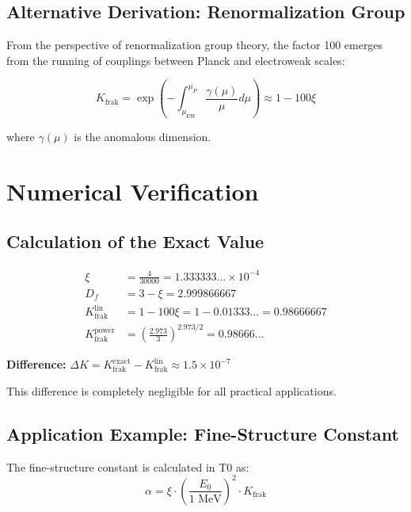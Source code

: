 	\subsection{Alternative Derivation: Renormalization Group}
	
	From the perspective of renormalization group theory, the factor 100 emerges from the running of couplings between Planck and electroweak scales:
	
	\begin{equation}
		K_{\text{frak}} = \exp\left(-\int_{\mu_{\text{EW}}}^{\mu_P} \frac{\gamma(\mu)}{\mu} d\mu\right) \approx 1 - 100\xi
	\end{equation}
	
	where $\gamma(\mu)$ is the anomalous dimension.
	
	\section{Numerical Verification}
	
	\subsection{Calculation of the Exact Value}
	
	\begin{align}
		\xi &= \frac{4}{30000} = 1.333333... \times 10^{-4} \\
		D_f &= 3 - \xi = 2.999866667 \\
		K_{\text{frak}}^{\text{lin}} &= 1 - 100\xi = 1 - 0.01333... = 0.98666667 \\
		K_{\text{frak}}^{\text{power}} &= \left(\frac{2.973}{3}\right)^{2.973/2} = 0.98666...
	\end{align}
	
	\textbf{Difference:} $\Delta K = K_{\text{frak}}^{\text{exact}} - K_{\text{frak}}^{\text{lin}} \approx 1.5 \times 10^{-7}$
	
	This difference is completely negligible for all practical applications.
	
	\subsection{Application Example: Fine-Structure Constant}
	
	The fine-structure constant is calculated in T0 as:
	\begin{equation}
		\alpha = \xi \cdot \left(\frac{E_0}{1 \text{ MeV}}\right)^2 \cdot K_{\text{frak}}
	\end{equation}
	
